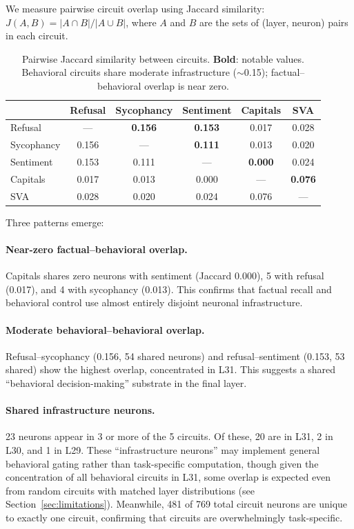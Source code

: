 \documentclass[11pt]{article}
\begin{document}
We measure pairwise circuit overlap using Jaccard similarity: $J(A, B) = |A \cap B| / |A \cup B|$, where $A$ and $B$ are the sets of (layer, neuron) pairs in each circuit.

\begin{table}[h]
\centering
\caption{Pairwise Jaccard similarity between circuits. \textbf{Bold}: notable values. Behavioral circuits share moderate infrastructure (${\sim}$0.15); factual--behavioral overlap is near zero.}
\label{tab:jaccard}
\small
\begin{tabular}{lccccc}
\toprule
& \textbf{Refusal} & \textbf{Sycophancy} & \textbf{Sentiment} & \textbf{Capitals} & \textbf{SVA} \\
\midrule
Refusal     & ---     & \textbf{0.156} & \textbf{0.153} & 0.017 & 0.028 \\
Sycophancy  & 0.156 & ---     & \textbf{0.111} & 0.013 & 0.020 \\
Sentiment   & 0.153 & 0.111 & ---     & \textbf{0.000} & 0.024 \\
Capitals    & 0.017 & 0.013 & 0.000 & ---     & \textbf{0.076} \\
SVA         & 0.028 & 0.020 & 0.024 & 0.076 & --- \\
\bottomrule
\end{tabular}
\end{table}

Three patterns emerge:

\paragraph{Near-zero factual--behavioral overlap.}
Capitals shares zero neurons with sentiment (Jaccard 0.000), 5 with refusal (0.017), and 4 with sycophancy (0.013).
This confirms that factual recall and behavioral control use almost entirely disjoint neuronal infrastructure.

\paragraph{Moderate behavioral--behavioral overlap.}
Refusal--sycophancy (0.156, 54 shared neurons) and refusal--sentiment (0.153, 53 shared) show the highest overlap, concentrated in L31.
This suggests a shared ``behavioral decision-making'' substrate in the final layer.

\paragraph{Shared infrastructure neurons.}
23 neurons appear in 3 or more of the 5 circuits.
Of these, 20 are in L31, 2 in L30, and 1 in L29.
These ``infrastructure neurons'' may implement general behavioral gating rather than task-specific computation, though given the concentration of all behavioral circuits in L31, some overlap is expected even from random circuits with matched layer distributions (see Section~\ref{sec:limitations}).
Meanwhile, 481 of 769 total circuit neurons are unique to exactly one circuit, confirming that circuits are overwhelmingly task-specific.
\end{document}
